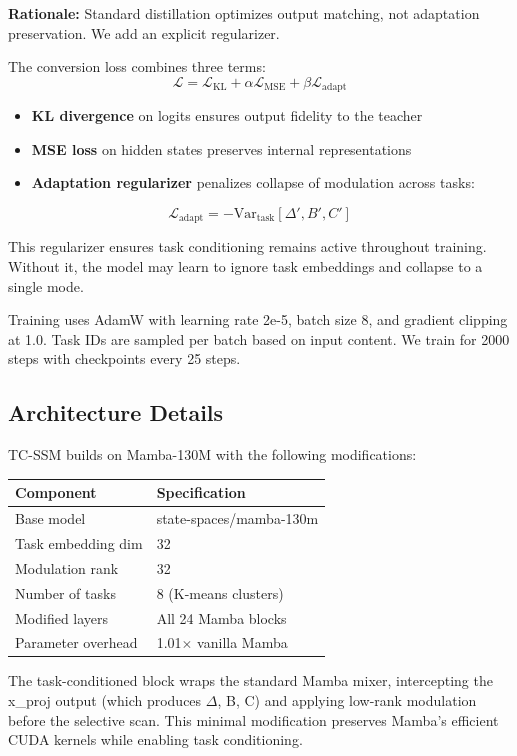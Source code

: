 \textbf{Rationale:} Standard distillation optimizes output matching, not adaptation preservation. We add an explicit regularizer.

The conversion loss combines three terms:
\begin{equation}
\mathcal{L} = \mathcal{L}_{\text{KL}} + \alpha \mathcal{L}_{\text{MSE}} + \beta \mathcal{L}_{\text{adapt}}
\end{equation}

\begin{itemize}
\item \textbf{KL divergence} on logits ensures output fidelity to the teacher
\item \textbf{MSE loss} on hidden states preserves internal representations
\item \textbf{Adaptation regularizer} penalizes collapse of modulation across tasks:
\end{itemize}
\begin{equation}
\mathcal{L}_{\text{adapt}} = -\text{Var}_{\text{task}}[\Delta', B', C']
\end{equation}

This regularizer ensures task conditioning remains active throughout training. Without it, the model may learn to ignore task embeddings and collapse to a single mode.

Training uses AdamW with learning rate 2e-5, batch size 8, and gradient clipping at 1.0. Task IDs are sampled per batch based on input content. We train for 2000 steps with checkpoints every 25 steps.

\subsection{Architecture Details}

TC-SSM builds on Mamba-130M with the following modifications:

\begin{table}[h]
\centering
\begin{tabular}{@{}ll@{}}
\toprule
Component & Specification \\
\midrule
Base model & state-spaces/mamba-130m \\
Task embedding dim & 32 \\
Modulation rank & 32 \\
Number of tasks & 8 (K-means clusters) \\
Modified layers & All 24 Mamba blocks \\
Parameter overhead & 1.01$\times$ vanilla Mamba \\
\bottomrule
\end{tabular}
\end{table}

The task-conditioned block wraps the standard Mamba mixer, intercepting the x\_proj output (which produces $\Delta$, B, C) and applying low-rank modulation before the selective scan. This minimal modification preserves Mamba's efficient CUDA kernels while enabling task conditioning.
